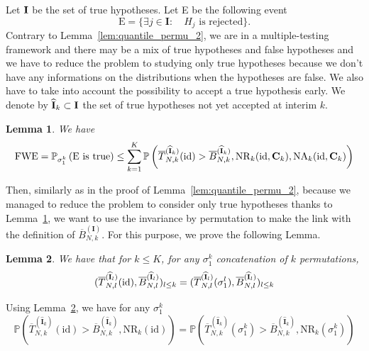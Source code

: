 \documentclass{article}
\theoremstyle{plain}
\newtheorem{Lemma}{Lemma}
\theoremstyle{remark}
\renewcommand{\P}{\mathbb{P}}
\newcommand{\1}{\mathbbm{1}}
\newcommand{\id}{\mathrm{id}}
\newcommand{\I}{\bf I}
\numberwithin{equation}{section}
\begin{document}
Let $\I$ be the set of true hypotheses. Let E be the following event
$$\mathrm{E}= \{ \exists j \in \textbf{I}: \quad H_j \text{ is rejected}\}.$$
Contrary to Lemma~\ref{lem:quantile_permu_2}, we are in a multiple-testing framework and there may be a mix of true hypotheses and false hypotheses and we have to reduce the problem to studying only true hypotheses because we don't have any informations on the distributions when the hypotheses are false. We also have to take into account the possibility to accept a true hypothesis early. We denote by $\widehat{\I}_k \subset \I$ the set of true hypotheses not yet accepted at interim $k$.
\begin{Lemma}\label{lem:multiple_test_FWE}
We have 
$$\mathrm{FWE} = \P_{\sigma_1^k}\left(\mathrm{E}\text{ is true} \right) \le \sum_{k=1}^K\P\left( \overline{T}_{N,k}^{(\widehat{\I}_k)}(\id) > \overline{B}_{N,k}^{(\widehat{\textbf{I}}_k)}, \mathrm{NR}_k(\id,{{\bf C}_k}), \mathrm{NA}_k(\id,{{\bf C}_k})\right)  $$
\end{Lemma}
Then, similarly as in the proof of Lemma~\ref{lem:quantile_permu_2}, because we managed to reduce the problem to consider only true hypotheses thanks to Lemma~\ref{lem:multiple_test_FWE}, we want to use the invariance by permutation to make the link with the definition of $\overline{B}_{N,k}^{(\textbf{I})}$. For this purpose, we prove the following Lemma.


\begin{Lemma}\label{lem:invariance}
We have that for $k \le K$, for any ${\sigma_1^k}$ concatenation of $k$ permutations, 
$$(\overline{T}_{N,l}^{(\widehat{\bf{I}}_l)}(\id),\overline{B}_{N,l}^{(\widehat{\bf{I}}_l)})_{l\le k}=(\overline{T}_{N,l}^{(\widehat{\bf{I}}_l)}(\sigma_1^l), \overline{B}_{N,l}^{(\widehat{\bf{I}}_l)})_{l\le k}$$
\end{Lemma}
Using Lemma~\ref{lem:invariance}, we have for any ${\sigma_1^k}$
$$\P\left(\overline{T}_{N,k}^{(\widehat{\textbf{I}}_k)}(\id) > \overline{B}_{N,k}^{(\widehat{\textbf{I}}_k)}, \mathrm{NR}_k(\id ) \right) = \P\left(\overline{T}_{N,k}^{(\widehat{\textbf{I}}_k)}({\sigma_1^k}) > \overline{B}_{N,k}^{(\widehat{\textbf{I}}_k)}, \mathrm{NR}_k({\sigma_1^k}) \right)$$
\end{document}
